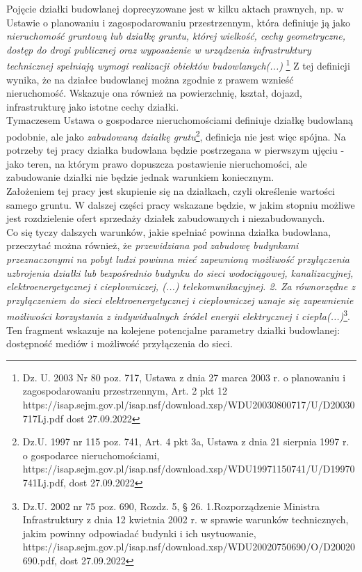 \documentclass[a4paper,12pt,twoside,openany]{report}
\begin{document}
Pojęcie działki budowlanej doprecyzowane jest w kilku aktach prawnych, np. w Ustawie o planowaniu i zagospodarowaniu przestrzennym, która definiuje ją jako \textit {nieruchomość gruntową lub działkę gruntu, której wielkość, cechy geometryczne, dostęp do drogi publicznej oraz wyposażenie w urządzenia infrastruktury technicznej spełniają wymogi realizacji obiektów budowlanych(...)}
\footnote{Dz. U. 2003 Nr 80 poz. 717, Ustawa z dnia 27 marca 2003 r. o planowaniu i zagospodarowaniu przestrzennym, Art. 2 pkt 12  https://isap.sejm.gov.pl/isap.nsf/download.xsp/WDU20030800717/U/D20030717Lj.pdf dost 27.09.2022}
Z tej definicji wynika, że na działce budowlanej można zgodnie z prawem wznieść nieruchomość. Wskazuje ona również na powierzchnię, kształ, dojazd, infrastrukturę jako istotne cechy działki.\\

Tymaczesem Ustawa o gospodarce nieruchomościami  definiuje działkę budowlaną podobnie, ale jako \textit {zabudowaną działkę grutu}\footnote{Dz.U. 1997 nr 115 poz. 741, Art. 4 pkt 3a,  Ustawa z dnia 21 sierpnia 1997 r. o gospodarce nieruchomościami, https://isap.sejm.gov.pl/isap.nsf/download.xsp/WDU19971150741/U/D19970741Lj.pdf, dost 27.09.2022}, definicja nie jest więc spójna. 
Na potrzeby tej pracy działka budowlana będzie postrzegana w pierwszym ujęciu -jako teren, na którym prawo dopuszcza postawienie nieruchomości, ale zabudowanie działki nie będzie jednak warunkiem koniecznym.\\


Założeniem tej pracy jest skupienie się na działkach, czyli określenie wartości samego gruntu. W dalszej części pracy wskazane będzie, w jakim stopniu możliwe jest rozdzielenie ofert sprzedaży działek zabudowanych i niezabudowanych.\\


Co się tyczy dalszych warunków, jakie spełniać powinna działka budowlana, przeczytać można również, że \textit{przewidziana pod zabudowę budynkami przeznaczonymi na pobyt ludzi powinna mieć zapewnioną możliwość przyłączenia uzbrojenia działki lub bezpośrednio budynku do sieci wodociągowej, kanalizacyjnej, elektroenergetycznej i ciepłowniczej, (...) telekomunikacyjnej. 2. Za równorzędne z przyłączeniem do sieci elektroenergetycznej i ciepłowniczej uznaje się zapewnienie możliwości korzystania  z indywidualnych  źródeł  energii  elektrycznej  i ciepła(...)}\footnote{Dz.U. 2002 nr 75 poz. 690, Rozdz. 5, § 26. 1.Rozporządzenie Ministra Infrastruktury z dnia 12 kwietnia 2002 r. w sprawie warunków technicznych, jakim powinny odpowiadać budynki i ich usytuowanie, https://isap.sejm.gov.pl/isap.nsf/download.xsp/WDU20020750690/O/D20020690.pdf, dost 27.09.2022}. Ten fragment wskazuje na kolejene potencjalne parametry działki budowlanej: dostępność mediów i możliwość przyłączenia do sieci.
\end{document}

